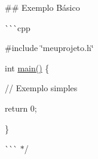 
\begin{DoxyItemize}
\item 
\item \#\# Exemplo Básico
\item \`{}\`{}\`{}cpp
\item \#include \char`\"{}meuprojeto.\+h\char`\"{}
\item int \mbox{\hyperlink{main-team-15_8c_a3c04138a5bfe5d72780bb7e82a18e627}{main()}} \{
\item // Exemplo simples
\item return 0;
\item \}
\item \`{}\`{}\`{} $\ast$/ 
\end{DoxyItemize}